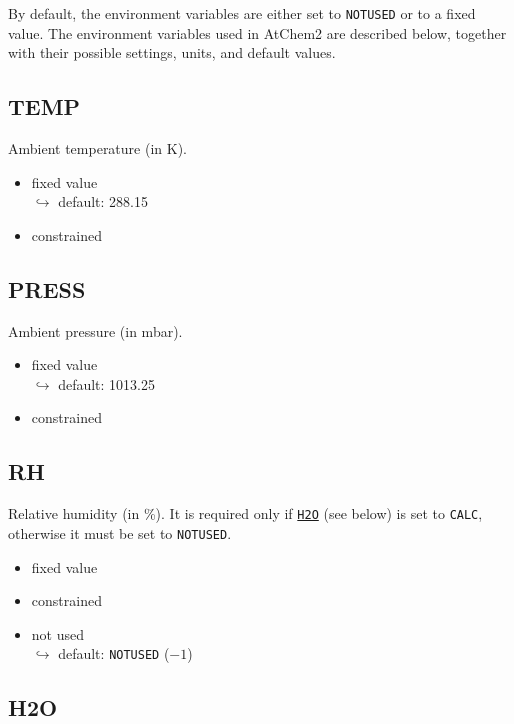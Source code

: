 By default, the environment variables are either set to \texttt{NOTUSED} or to a fixed
value. The environment variables used in AtChem2 are described below, together with their
possible settings, units, and default values.

\subsection{TEMP} \label{subsec:temp}

Ambient temperature (in K).

\begin{itemize}
\item fixed value\\
  $\hookrightarrow$ default: 288.15
\item constrained
\end{itemize}

\subsection{PRESS} \label{subsec:press}

Ambient pressure (in mbar).

\begin{itemize}
\item fixed value\\
  $\hookrightarrow$ default: 1013.25
\item constrained
\end{itemize}

\subsection{RH} \label{subsec:rh}

Relative humidity (in \%). It is required only if \hyperref[subsec:h2o]{\texttt{H2O}} (see
below) is set to \texttt{CALC}, otherwise it must be set to \texttt{NOTUSED}.

\begin{itemize}
\item fixed value
\item constrained
\item not used\\
  $\hookrightarrow$ default: \texttt{NOTUSED} ($-1$)
\end{itemize}

\subsection{H2O} \label{subsec:h2o}

